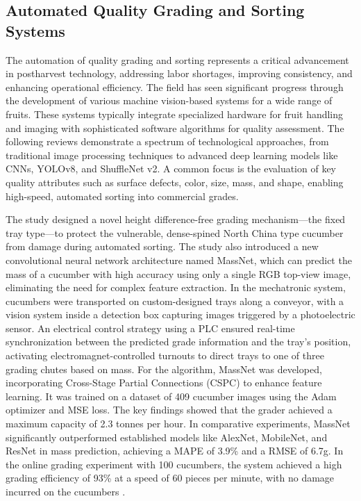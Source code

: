 {\subsection{Automated Quality Grading and Sorting Systems}

The automation of quality grading and sorting represents a critical advancement in postharvest technology, addressing labor shortages, improving consistency, and enhancing operational efficiency. The field has seen significant progress through the development of various machine vision-based systems for a wide range of fruits. These systems typically integrate specialized hardware for fruit handling and imaging with sophisticated software algorithms for quality assessment. The following reviews demonstrate a spectrum of technological approaches, from traditional image processing techniques to advanced deep learning models like CNNs, YOLOv8, and ShuffleNet v2. A common focus is the evaluation of key quality attributes such as surface defects, color, size, mass, and shape, enabling high-speed, automated sorting into commercial grades. 


The study designed a novel height difference-free grading mechanism—the fixed tray type—to protect the vulnerable, dense-spined North China type cucumber from damage during automated sorting. The study also introduced a new convolutional neural network architecture named MassNet, which can predict the mass of a cucumber with high accuracy using only a single RGB top-view image, eliminating the need for complex feature extraction. In the mechatronic system, cucumbers were transported on custom-designed trays along a conveyor, with a vision system inside a detection box capturing images triggered by a photoelectric sensor. An electrical control strategy using a PLC ensured real-time synchronization between the predicted grade information and the tray’s position, activating electromagnet-controlled turnouts to direct trays to one of three grading chutes based on mass. For the algorithm, MassNet was developed, incorporating Cross-Stage Partial Connections (CSPC) to enhance feature learning. It was trained on a dataset of 409 cucumber images using the Adam optimizer and MSE loss. The key findings showed that the grader achieved a maximum capacity of 2.3 tonnes per hour. In comparative experiments, MassNet significantly outperformed established models like AlexNet, MobileNet, and ResNet in mass prediction, achieving a MAPE of 3.9\% and a RMSE of 6.7g. In the online grading experiment with 100 cucumbers, the system achieved a high grading efficiency of 93\% at a speed of 60 pieces per minute, with no damage incurred on the cucumbers \citep{liu2024design}.

}

